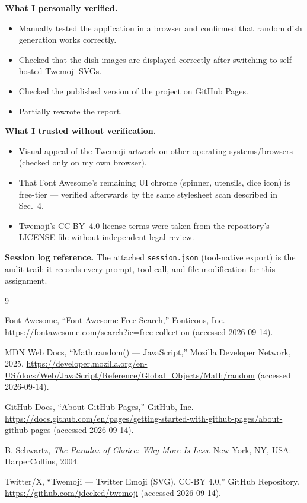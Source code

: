 \documentclass[11pt,a4paper]{article}
\begin{document}
\textbf{What I personally verified.}
\begin{itemize}[leftmargin=2em,itemsep=1pt]
  \item Manually tested the application in a browser and confirmed that random dish generation works correctly.
  \item Checked that the dish images are displayed correctly after switching to self-hosted Twemoji SVGs.
  \item Checked the published version of the project on GitHub Pages.
  \item Partially rewrote the report.
\end{itemize}

\textbf{What I trusted without verification.}
\begin{itemize}[leftmargin=2em,itemsep=1pt]
  \item Visual appeal of the Twemoji artwork on other operating systems/browsers (checked
        only on my own browser).
  \item That Font Awesome's remaining UI chrome (spinner, utensils, dice icon) is free-tier
        --- verified afterwards by the same stylesheet scan described in Sec.~4.
  \item Twemoji's CC-BY~4.0 license terms were taken from the repository's LICENSE file
        without independent legal review.
\end{itemize}

\textbf{Session log reference.} The attached \texttt{session.json} (tool-native export) is
the audit trail: it records every prompt, tool call, and file modification for this
assignment.

\begin{thebibliography}{9}
\small

Font Awesome, ``Font Awesome Free Search,'' Fonticons, Inc.
\url{https://fontawesome.com/search?ic=free-collection} (accessed 2026-09-14).

MDN Web Docs, ``Math.random() --- JavaScript,'' Mozilla Developer Network, 2025.
\url{https://developer.mozilla.org/en-US/docs/Web/JavaScript/Reference/Global_Objects/Math/random}
(accessed 2026-09-14).

GitHub Docs, ``About GitHub Pages,'' GitHub, Inc.
\url{https://docs.github.com/en/pages/getting-started-with-github-pages/about-github-pages}
(accessed 2026-09-14).

B. Schwartz, \emph{The Paradox of Choice: Why More Is Less}. New York, NY, USA:
HarperCollins, 2004.

Twitter/X, ``Twemoji --- Twitter Emoji (SVG), CC-BY 4.0,'' GitHub Repository.
\url{https://github.com/jdecked/twemoji} (accessed 2026-09-14).

\end{thebibliography}
\end{document}
